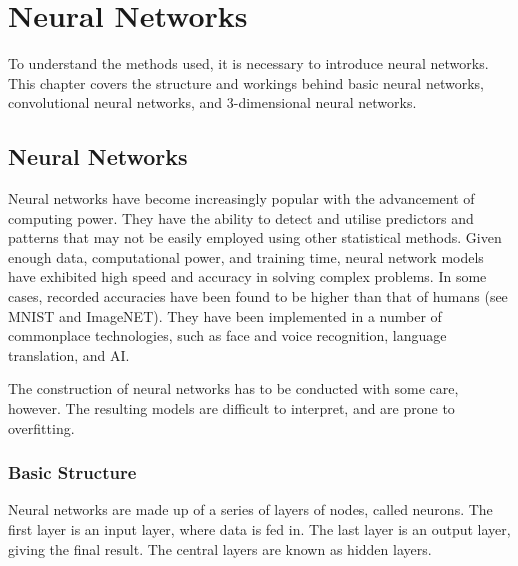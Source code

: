 \documentclass[honours,12pt]{unswthesis}
\numberwithin{equation}{section}
\begin{document}
\chapter{Neural Networks}\label{neuralNets-intro}

To understand the methods used, it is necessary to introduce neural networks. This chapter covers the structure and workings behind basic neural networks, convolutional neural networks, and 3-dimensional neural networks.

% 
% 

{\noindent}\citep{AdamsH.H.Hieab2013RMfD}

\section{Neural Networks}\label{nnets}

Neural networks have become increasingly popular with the advancement of computing power. They have the ability to detect and utilise predictors and patterns that may not be easily employed using other statistical methods. Given enough data, computational power, and training time, neural network models have exhibited high speed and accuracy in solving complex problems. In some cases, recorded accuracies have been found to be higher than that of humans (see MNIST and ImageNET). They have been implemented in a number of commonplace technologies, such as face and voice recognition, language translation, and AI.

The construction of neural networks has to be conducted with some care, however. The resulting models are difficult to interpret, and are prone to overfitting. 

\subsection{Basic Structure}\label{nnets-structure}

Neural networks are made up of a series of layers of nodes, called neurons. The first layer is an input layer, where data is fed in. The last layer is an output layer, giving the final result. The central layers are known as hidden layers.

\end{document}
